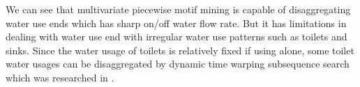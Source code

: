 We can see that multivariate piecewise motif mining is capable of 
disaggregating water use ends which has sharp on/off water flow rate. 
But it has limitations in dealing with water use end with irregular water use patterns 
such as toilets and sinks. 
Since the water usage of toilets is relatively fixed if using alone, 
some toilet water usages can be disaggregated by dynamic time warping subsequence search 
which was researched in \cite{nguyen2013development}. 

